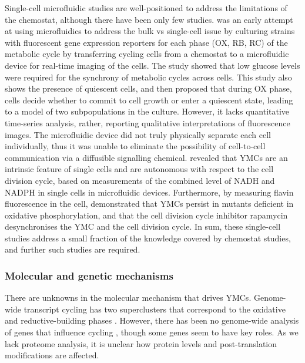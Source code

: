 Single-cell microfluidic studies are well-positioned to address the limitations of the chemostat,
although there have been only few studies.
\textcite{laxmanBehaviorMetabolicCycling2010} was an early attempt at using microfluidics to address the bulk vs single-cell issue by culturing strains with fluorescent gene expression reporters for each phase (OX, RB, RC) of the metabolic cycle by transferring cycling cells from a chemostat to a microfluidic device for real-time imaging of the cells.
The study showed that low glucose levels were required for the synchrony of metabolic cycles across cells.
This study also shows the presence of quiescent cells, and then proposed that during OX phase, cells decide whether to commit to cell growth or enter a quiescent state, leading to a model of two subpopulations in the culture.
However, it lacks quantitative time-series analysis, rather, reporting qualitative interpretations of fluorescence images.
The microfluidic device did not truly physically separate each cell individually, thus it was unable to eliminate the possibility of cell-to-cell communication via a diffusible signalling chemical.
\textcite{papagiannakisAutonomousMetabolicOscillations2017} revealed that YMCs are an intrinsic feature of single cells and are autonomous with respect to the cell division cycle, based on measurements of the combined level of NADH and NADPH in single cells in microfluidic devices.
Furthermore, by measuring flavin fluorescence in the cell, \textcite{baumgartnerFlavinbasedMetabolicCycles2018} demonstrated that YMCs persist in mutants deficient in oxidative phosphorylation, and that the cell division cycle inhibitor rapamycin desynchronises the YMC and the cell division cycle.
In sum, these single-cell studies address a small fraction of the knowledge covered by chemostat studies, and further such studies are required.


\subsubsection{Molecular and genetic mechanisms}
\label{subsubsec:intro-ymc-unresolved-molecular}

There are unknowns in the molecular mechanism that drives YMCs.
Genome-wide transcript cycling has two superclusters that correspond to the oxidative and reductive-building phases \parencite{machneYinYangYeast2012}.
However, there has been no genome-wide analysis of genes that influence cycling \parencite{mellorMolecularBasisMetabolic2016}, though some genes seem to have key roles.
As we lack proteome analysis, it is unclear how protein levels and post-translation modifications are affected.

